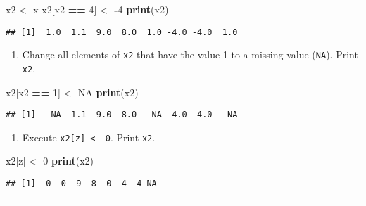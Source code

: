 \documentclass[]{article}
\newenvironment{Shaded}{\begin{snugshade}}{\end{snugshade}}
\newcommand{\KeywordTok}[1]{\textcolor[rgb]{0.13,0.29,0.53}{\textbf{#1}}}
\newcommand{\DecValTok}[1]{\textcolor[rgb]{0.00,0.00,0.81}{#1}}
\newcommand{\StringTok}[1]{\textcolor[rgb]{0.31,0.60,0.02}{#1}}
\newcommand{\OtherTok}[1]{\textcolor[rgb]{0.56,0.35,0.01}{#1}}
\newcommand{\OperatorTok}[1]{\textcolor[rgb]{0.81,0.36,0.00}{\textbf{#1}}}
\newcommand{\NormalTok}[1]{#1}
\providecommand{\tightlist}{%
  \setlength{\itemsep}{0pt}\setlength{\parskip}{0pt}}
\begin{document}
\begin{Shaded}
\begin{Highlighting}[]
\NormalTok{x2 <-}\StringTok{ }\NormalTok{x  }
\NormalTok{x2[x2 }\OperatorTok{==}\StringTok{ }\DecValTok{4}\NormalTok{] <-}\StringTok{ }\OperatorTok{-}\DecValTok{4}
\KeywordTok{print}\NormalTok{(x2)}
\end{Highlighting}
\end{Shaded}

\begin{verbatim}
## [1]  1.0  1.1  9.0  8.0  1.0 -4.0 -4.0  1.0
\end{verbatim}

\begin{enumerate}
\def\labelenumi{\arabic{enumi}.}
\setcounter{enumi}{3}
\tightlist
\item
  Change all elements of \texttt{x2} that have the value 1 to a missing
  value (\texttt{NA}). Print \texttt{x2}.
\end{enumerate}

\begin{Shaded}
\begin{Highlighting}[]
\NormalTok{x2[x2 }\OperatorTok{==}\StringTok{ }\DecValTok{1}\NormalTok{] <-}\StringTok{ }\OtherTok{NA}
\KeywordTok{print}\NormalTok{(x2)}
\end{Highlighting}
\end{Shaded}

\begin{verbatim}
## [1]   NA  1.1  9.0  8.0   NA -4.0 -4.0   NA
\end{verbatim}

\begin{enumerate}
\def\labelenumi{\arabic{enumi}.}
\setcounter{enumi}{4}
\tightlist
\item
  Execute \texttt{x2{[}z{]}\ \textless{}-\ 0}. Print \texttt{x2}.
\end{enumerate}

\begin{Shaded}
\begin{Highlighting}[]
\NormalTok{x2[z] <-}\StringTok{ }\DecValTok{0}
\KeywordTok{print}\NormalTok{(x2)}
\end{Highlighting}
\end{Shaded}

\begin{verbatim}
## [1]  0  0  9  8  0 -4 -4 NA
\end{verbatim}

\begin{center}\rule{0.5\linewidth}{\linethickness}\end{center}
\end{document}

